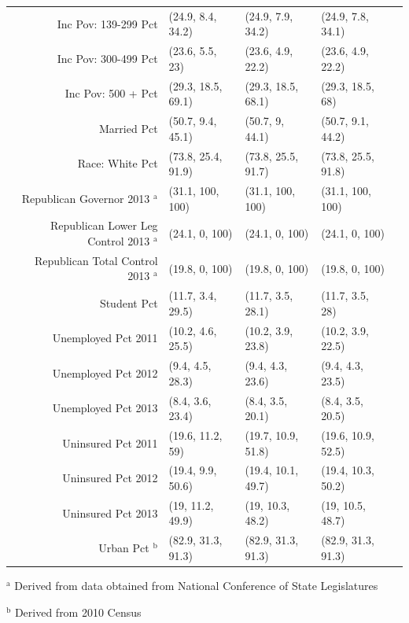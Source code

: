 \begin{table}[h!]
\begin{tabular}{rllll}
  Inc Pov: 139-299 Pct & (24.9, 8.4, 34.2) & (24.9, 7.9, 34.2) & (24.9, 7.8, 34.1) \\ 
  Inc Pov: 300-499 Pct & (23.6, 5.5, 23) & (23.6, 4.9, 22.2) & (23.6, 4.9, 22.2) \\ 
  Inc Pov: 500 + Pct & (29.3, 18.5, 69.1) & (29.3, 18.5, 68.1) & (29.3, 18.5, 68) \\ 
  Married Pct & (50.7, 9.4, 45.1) & (50.7, 9, 44.1) & (50.7, 9.1, 44.2) \\ 
  Race: White Pct & (73.8, 25.4, 91.9) & (73.8, 25.5, 91.7) & (73.8, 25.5, 91.8) \\ 
  Republican Governor 2013 $^\textrm{a}$& (31.1, 100, 100) & (31.1, 100, 100) & (31.1, 100, 100) \\ 
  Republican Lower Leg Control 2013 $^\textrm{a}$ & (24.1, 0, 100) & (24.1, 0, 100) & (24.1, 0, 100) \\ 
  Republican Total Control 2013 $^\textrm{a}$ & (19.8, 0, 100) & (19.8, 0, 100) & (19.8, 0, 100) \\ 
Student Pct & (11.7, 3.4, 29.5) & (11.7, 3.5, 28.1) & (11.7, 3.5, 28) \\ 
  Unemployed Pct 2011 & (10.2, 4.6, 25.5) & (10.2, 3.9, 23.8) & (10.2, 3.9, 22.5) \\ 
  Unemployed Pct 2012 & (9.4, 4.5, 28.3) & (9.4, 4.3, 23.6) & (9.4, 4.3, 23.5) \\ 
  Unemployed Pct 2013 & (8.4, 3.6, 23.4) & (8.4, 3.5, 20.1) & (8.4, 3.5, 20.5) \\ 
  Uninsured Pct 2011 & (19.6, 11.2, 59) & (19.7, 10.9, 51.8) & (19.6, 10.9, 52.5) \\ 
  Uninsured Pct 2012 & (19.4, 9.9, 50.6) & (19.4, 10.1, 49.7) & (19.4, 10.3, 50.2) \\ 
  Uninsured Pct 2013 & (19, 11.2, 49.9) & (19, 10.3, 48.2) & (19, 10.5, 48.7) \\ 
  Urban Pct $^\textrm{b}$ & (82.9, 31.3, 91.3) & (82.9, 31.3, 91.3) & (82.9, 31.3, 91.3) \\ 
   \hline
\end{tabular}
     \vspace{1ex}
     
     {\raggedright $^\textrm{a}$ Derived from data obtained from National Conference of State Legislatures \par
     $^\textrm{b}$ Derived from 2010 Census \par
     }
\end{table}

